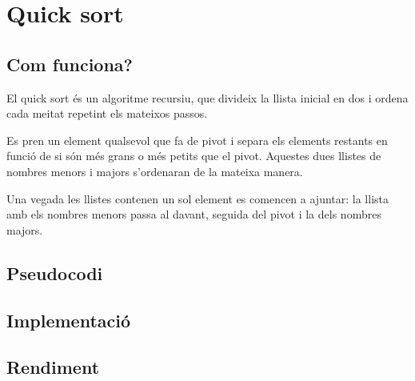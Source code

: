 \chapter{Quick sort}

\section{Com funciona?}
El quick sort és un algoritme recursiu, que divideix la llista inicial en dos i ordena cada meitat repetint els mateixos passos.

Es pren un element qualsevol que fa de pivot i separa els elements restants en funció de si són més grans o més petits que el pivot. Aquestes dues llistes de nombres menors i majors s'ordenaran de la mateixa manera.

Una vegada les llistes contenen un sol element es comencen a ajuntar: la llista amb els nombres menors passa al davant, seguida del pivot i la dels nombres majors.
\section{Pseudocodi}
\section{Implementació}

\section{Rendiment}
